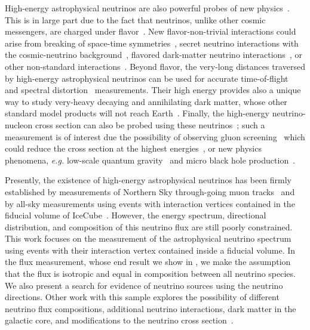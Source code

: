 High-energy astrophysical neutrinos are also powerful probes of new physics~\cite{Ahlers:2018mkf}.
This is in large part due to the fact that neutrinos, unlike other cosmic messengers, are charged under flavor~\cite{Gaisser:1994yf,Ackermann:2019cxh,Arguelles:2019rbn}.
New flavor-non-trivial interactions could arise from breaking of space-time symmetries~\cite{Diaz:2013wia,Arguelles:2015dca}, secret neutrino interactions with the cosmic-neutrino background~\cite{Davis:2015rza,Cherry:2016jol,Arguelles:2017atb,Kelly:2018tyg}, flavored dark-matter neutrino interactions~\cite{Capozzi:2018bps,Farzan:2018pnk,Choi:2019zxy}, or other non-standard interactions~\cite{Rasmussen:2017ert}.
Beyond flavor, the very-long distances traversed by high-energy astrophysical neutrinos can be used for accurate time-of-flight~\cite{Ellis:2018ogq} and spectral distortion~\cite{Liao:2017yuy} measurements.
Their high energy provides also a unique way to study very-heavy decaying and annihilating dark matter, whose other standard model products will not reach Earth~\cite{Aartsen:2018mxl}.
Finally, the high-energy neutrino-nucleon cross section can also be probed using these neutrinos~\cite{Bertone:2018dse,Anchordoqui:2019ufu}; such a measurement is of interest due the possibility of observing gluon screening~\cite{Henley:2005ms} which could reduce the cross section at the highest energies~\cite{Block:2014kza,Goncalves:2015fua,Arguelles:2015wba}, or new physics phenomena, \textit{e.g.} low-scale quantum gravity~\cite{AlvarezMuniz:2001mk} and micro black hole production~\cite{AlvarezMuniz:2002ga,Mack:2019bps}.

Presently, the existence of high-energy astrophysical neutrinos has been firmly established by measurements of Northern Sky through-going muon tracks~\cite{Aartsen:2015rwa,Aartsen:2016xlq} and by all-sky measurements using events with interaction vertices contained in the fiducial volume of IceCube~\cite{Aartsen:2013jdh,Aartsen:2014gkd,Aartsen:2015zva,Aartsen:2017mau}.
However, the energy spectrum, directional distribution, and composition of this neutrino flux are still poorly constrained.
This work focuses on the measurement of the astrophysical neutrino spectrum using events with their interaction vertex contained inside a fiducial volume.
In the flux measurement, whose end result we show in , we make the assumption that the flux is isotropic and equal in composition between all neutrino species.
We also present a search for evidence of neutrino sources using the neutrino directions.
Other work with this sample explores the possibility of different neutrino flux compositions, additional neutrino interactions, dark matter in the galactic core, and modifications to the neutrino cross section~\cite{HESETAU,HESEFLV,HESEDM,HESEXS}.

